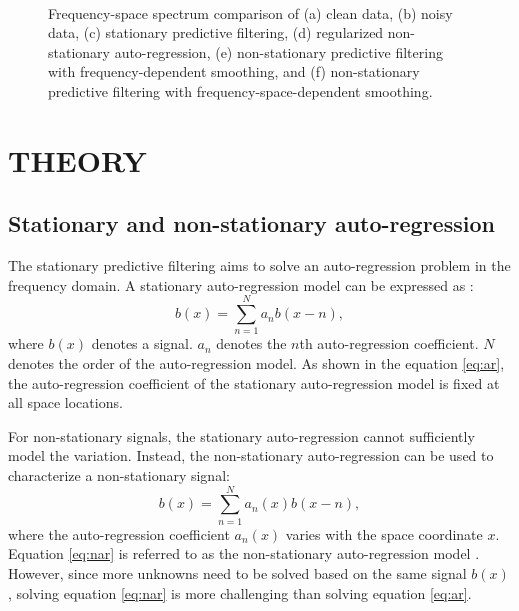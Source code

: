 \begin{figure*}[ht!]
\centering
{}
\\
\caption{Frequency-space spectrum comparison of (a) clean data, (b) noisy data, (c) stationary predictive filtering, (d) regularized non-stationary auto-regression, (e) non-stationary predictive filtering with frequency-dependent smoothing, and (f) non-stationary predictive filtering with frequency-space-dependent smoothing.}
\label{fig:hyper-f,hypern-f,test2-f,test1-f,test00-f,test3-f}
\end{figure*}


\section{THEORY}
\subsection{Stationary and non-stationary auto-regression}
The stationary predictive filtering aims to solve an auto-regression problem in the frequency domain. A stationary auto-regression model can be expressed as \cite{sdrnar}:
\begin{equation}
\label{eq:ar}
b(x) = \sum_{n=1}^{N}a_nb(x-n),
\end{equation}
where $b(x)$ denotes a signal. $a_n$ denotes the $n$th auto-regression coefficient. $N$ denotes the order of the auto-regression model. %
As shown in the equation \ref{eq:ar}, the auto-regression coefficient of the stationary auto-regression model is fixed at all space locations.

For non-stationary signals, the stationary auto-regression cannot sufficiently model the variation. Instead, the non-stationary auto-regression can be used to characterize a non-stationary signal:
\begin{equation}
\label{eq:nar}
b(x) = \sum_{n=1}^{N}a_n(x)b(x-n),
\end{equation}
where the auto-regression coefficient $a_n(x)$ varies with the space coordinate $x$. Equation \ref{eq:nar} is referred to as the non-stationary auto-regression model \cite{fomel20132}. However, since more unknowns need to be solved based on the same signal $b(x)$, solving equation \ref{eq:nar} is more challenging than solving equation \ref{eq:ar}. 

